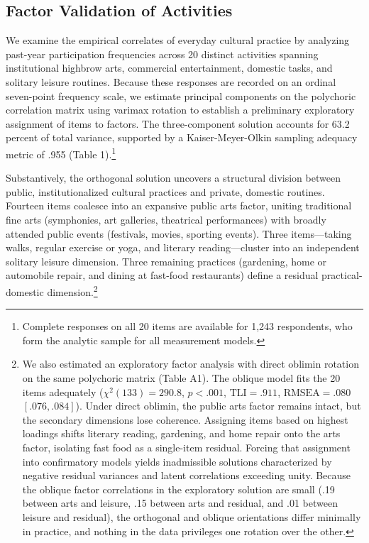 \documentclass[
  12pt
]{article}
\author{}
\date{}
\begin{document}
\hypertarget{factor-validation-of-activities}{%
\subsection{Factor Validation of Activities}\label{factor-validation-of-activities}}

We examine the empirical correlates of everyday cultural practice by analyzing past-year participation frequencies across 20 distinct activities spanning institutional highbrow arts, commercial entertainment, domestic tasks, and solitary leisure routines. Because these responses are recorded on an ordinal seven-point frequency scale, we estimate principal components on the polychoric correlation matrix using varimax rotation to establish a preliminary exploratory assignment of items to factors. The three-component solution accounts for 63.2 percent of total variance, supported by a Kaiser-Meyer-Olkin sampling adequacy metric of .955 (Table 1).\footnote{Complete responses on all 20 items are available for 1,243 respondents, who form the analytic sample for all measurement models.} 

Substantively, the orthogonal solution uncovers a structural division between public, institutionalized cultural practices and private, domestic routines. Fourteen items coalesce into an expansive public arts factor, uniting traditional fine arts (symphonies, art galleries, theatrical performances) with broadly attended public events (festivals, movies, sporting events). Three items---taking walks, regular exercise or yoga, and literary reading---cluster into an independent solitary leisure dimension. Three remaining practices (gardening, home or automobile repair, and dining at fast-food restaurants) define a residual practical-domestic dimension.\footnote{We also estimated an exploratory factor analysis with direct oblimin rotation on the same polychoric matrix (Table A1). The oblique model fits the 20 items adequately ($\chi^2(133) = 290.8$, $p < .001$, $\text{TLI} = .911$, $\text{RMSEA} = .080$ $[.076, .084]$). Under direct oblimin, the public arts factor remains intact, but the secondary dimensions lose coherence. Assigning items based on highest loadings shifts literary reading, gardening, and home repair onto the arts factor, isolating fast food as a single-item residual. Forcing that assignment into confirmatory models yields inadmissible solutions characterized by negative residual variances and latent correlations exceeding unity. Because the oblique factor correlations in the exploratory solution are small (.19 between arts and leisure, .15 between arts and residual, and .01 between leisure and residual), the orthogonal and oblique orientations differ minimally in practice, and nothing in the data privileges one rotation over the other.}
\end{document}
